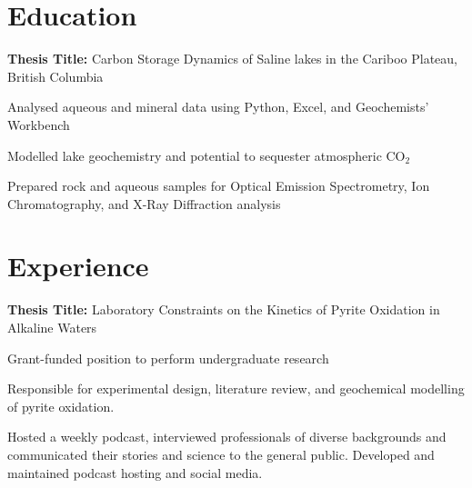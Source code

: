 \documentclass[]{deedy-resume-openfont}
\begin{document}
    
%
%
%
%
\section{Education}
\textbf{Thesis Title:} Carbon Storage Dynamics of Saline lakes in the Cariboo Plateau, British Columbia

\begin{tightemize}
\item Analysed aqueous and mineral data using Python, Excel, and Geochemists’ Workbench
\item Modelled lake geochemistry and potential to sequester atmospheric CO$_{2}$
\item Prepared rock and aqueous samples for Optical Emission Spectrometry, Ion Chromatography, and X-Ray Diffraction analysis
\end{tightemize}
\sectionsep
%
%
\section{Experience}
\textbf{Thesis Title:} Laboratory Constraints on the Kinetics of Pyrite Oxidation in Alkaline Waters
\begin{tightemize}
\item Grant-funded position to perform undergraduate research 
\item Responsible for experimental design, literature review, and geochemical modelling of pyrite oxidation. 
\end{tightemize}


\sectionsep

Hosted a weekly podcast, interviewed professionals of diverse backgrounds and communicated their stories and science to the general public. Developed and maintained podcast hosting and social media.
\sectionsep
\end{document}
